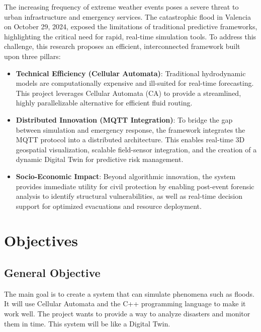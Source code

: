 The increasing frequency of extreme weather events poses a severe threat to urban infrastructure and emergency services. The catastrophic 
flood in Valencia on October 29, 2024, exposed the limitations of traditional predictive frameworks, highlighting the critical need for 
rapid, real-time simulation tools. To address this challenge, this research proposes an efficient, interconnected framework built upon 
three pillars:

\begin{itemize}
    \item \textbf{Technical Efficiency (Cellular Automata)}: Traditional hydrodynamic models are computationally expensive and ill-suited 
    for real-time forecasting. This project leverages Cellular Automata (CA) to provide a streamlined, highly parallelizable alternative 
    for efficient fluid routing.

    \item \textbf{Distributed Innovation (MQTT Integration)}: To bridge the gap between simulation and emergency response, the framework 
    integrates the MQTT protocol into a distributed architecture. This enables real-time 3D geospatial visualization, scalable field-sensor 
    integration, and the creation of a dynamic Digital Twin for predictive risk management.

    \item \textbf{Socio-Economic Impact}: Beyond algorithmic innovation, the system provides immediate utility for civil protection by 
    enabling post-event forensic analysis to identify structural vulnerabilities, as well as real-time decision support for optimized 
    evacuations and resource deployment.
\end{itemize}


\section{Objectives}

\subsection{General Objective}

The main goal is to create a system that can simulate phenomena such as floods. It will use Cellular Automata and the C++ programming 
language to make it work well. The project wants to provide a way to analyze disasters and monitor them in time. This system will be 
like a Digital Twin.


